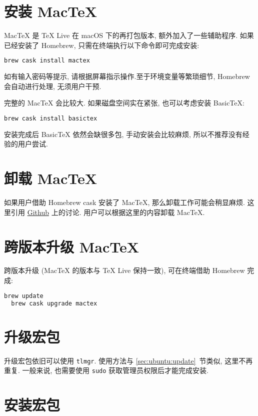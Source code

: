 \section{安装 Mac\TeX}

Mac\TeX{} 是 \TeX{} Live 在 macOS 下的再打包版本, 额外加入了一些辅助程序. 如果已经安装了 Homebrew,
只需在\textsf{终端}执行以下命令即可完成安装:
\begin{lstlisting}[language=bash]
  brew cask install mactex
\end{lstlisting}
如有输入密码等提示, 请根据屏幕指示操作.至于环境变量等繁琐细节, Homebrew 会自动进行处理,
无须用户干预.

完整的 Mac\TeX{} 会比较大. 如果磁盘空间实在紧张, 也可以考虑安装 Basic\TeX:
\begin{lstlisting}[language=bash]
  brew cask install basictex
\end{lstlisting}
安装完成后 Basic\TeX{} 依然会缺很多包, 手动安装会比较麻烦, 所以不推荐没有经验的用户尝试.

\section{卸载 Mac\TeX}

如果用户借助 Homebrew cask 安装了 Mac\TeX,
那么卸载工作可能会稍显麻烦.
这里引用 \href{https://github.com/Homebrew/homebrew-cask/issues/32073}{Github} 上的讨论.
用户可以根据这里的内容卸载 Mac\TeX.

\section{跨版本升级 Mac\TeX}

跨版本升级 (Mac\TeX{} 的版本与 \TeX{} Live 保持一致), 可在\textsf{终端}借助 Homebrew 完成:
\begin{lstlisting}[language=bash]
  brew update
  brew cask upgrade mactex
\end{lstlisting}

\section{升级宏包}

升级宏包依旧可以使用 \texttt{tlmgr}.
使用方法与 \ref{sec:ubuntu:update}~节类似, 这里不再重复.
一般来说, 也需要使用 \texttt{sudo} 获取管理员权限后才能完成安装.

\section{安装宏包}

